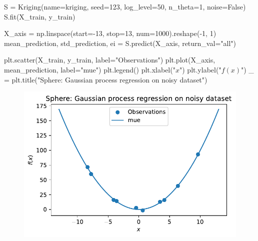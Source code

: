 \documentclass[
  letterpaper,
  DIV=11,
  numbers=noendperiod]{scrreprt}
\newenvironment{Shaded}{\begin{snugshade}}{\end{snugshade}}
\newcommand{\DecValTok}[1]{\textcolor[rgb]{0.68,0.00,0.00}{#1}}
\newcommand{\NormalTok}[1]{\textcolor[rgb]{0.00,0.23,0.31}{#1}}
\newcommand{\OperatorTok}[1]{\textcolor[rgb]{0.37,0.37,0.37}{#1}}
\newcommand{\StringTok}[1]{\textcolor[rgb]{0.13,0.47,0.30}{#1}}
\newcommand{\VariableTok}[1]{\textcolor[rgb]{0.07,0.07,0.07}{#1}}
\begin{document}
\begin{Shaded}
\begin{Highlighting}[]
\NormalTok{S }\OperatorTok{=}\NormalTok{ Kriging(name}\OperatorTok{=}\StringTok{\textquotesingle{}kriging\textquotesingle{}}\NormalTok{,}
\NormalTok{            seed}\OperatorTok{=}\DecValTok{123}\NormalTok{,}
\NormalTok{            log\_level}\OperatorTok{=}\DecValTok{50}\NormalTok{,}
\NormalTok{            n\_theta}\OperatorTok{=}\DecValTok{1}\NormalTok{,}
\NormalTok{            noise}\OperatorTok{=}\VariableTok{False}\NormalTok{)}
\NormalTok{S.fit(X\_train, y\_train)}

\NormalTok{X\_axis }\OperatorTok{=}\NormalTok{ np.linspace(start}\OperatorTok{={-}}\DecValTok{13}\NormalTok{, stop}\OperatorTok{=}\DecValTok{13}\NormalTok{, num}\OperatorTok{=}\DecValTok{1000}\NormalTok{).reshape(}\OperatorTok{{-}}\DecValTok{1}\NormalTok{, }\DecValTok{1}\NormalTok{)}
\NormalTok{mean\_prediction, std\_prediction, ei }\OperatorTok{=}\NormalTok{ S.predict(X\_axis, return\_val}\OperatorTok{=}\StringTok{"all"}\NormalTok{)}

\NormalTok{plt.scatter(X\_train, y\_train, label}\OperatorTok{=}\StringTok{"Observations"}\NormalTok{)}
\NormalTok{plt.plot(X\_axis, mean\_prediction, label}\OperatorTok{=}\StringTok{"mue"}\NormalTok{)}
\NormalTok{plt.legend()}
\NormalTok{plt.xlabel(}\StringTok{"$x$"}\NormalTok{)}
\NormalTok{plt.ylabel(}\StringTok{"$f(x)$"}\NormalTok{)}
\NormalTok{\_ }\OperatorTok{=}\NormalTok{ plt.title(}\StringTok{"Sphere: Gaussian process regression on noisy dataset"}\NormalTok{)}
\end{Highlighting}
\end{Shaded}

\begin{figure}[H]

{\centering \includegraphics{08_spot_noisy_files/figure-pdf/cell-10-output-1.pdf}

}

\end{figure}
\end{document}
